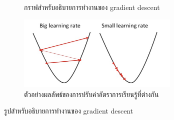 \begin{enumerate}
\begin{figure}
\begin{subfigure}[!ht]{0.5\textwidth}
				\caption{กราฟสำหรับอธิบายการทำงานของ gradient descent}
				\label{fig:gd_explain}
		\end{subfigure}
		\begin{subfigure}[!ht]{0.5\textwidth}
			\centering
			\includegraphics[width=0.85\textwidth]{chapter2/images/learning_rate.png}
				\caption{ตัวอย่างผลลัพธ์ของการปรับค่าอัตราการเรียนรู้ที่ต่างกัน}
				\label{fig:learning_rate}
		\end{subfigure}
		\caption{รูปสำหรับอธิบายการทำงานของ gradient descent}
		\label{fig:gd_figure}
	\end{figure}
	

\end{enumerate}
